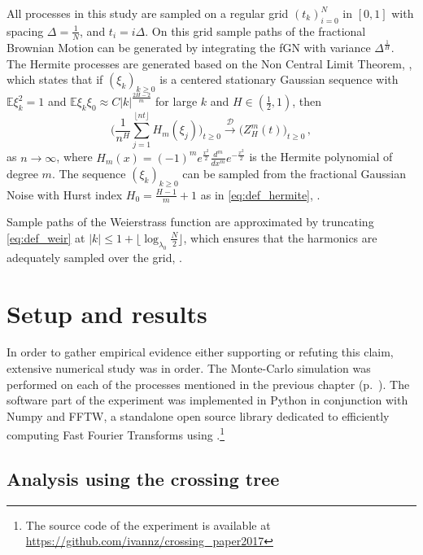 \documentclass[a4paper]{article}
\newcommand{\ex}{\mathbb{E}}
\newcommand{\Dcal}{\mathcal{D}}
\begin{document}
All processes in this study are sampled on a regular grid $(t_k)_{i=0}^N$ in $[0,1]$
with spacing $\Delta=\frac{1}{N}$, and $t_i = i \Delta$. On this grid sample paths
of the fractional Brownian Motion can be generated by integrating the fGN with variance
$\Delta^\frac{1}{H}$. The Hermite processes are generated based on the Non Central
Limit Theorem, \cite{embrechts2002,tudor2008}, which states that if $(\xi_k)_{k\geq0}$
is a centered stationary Gaussian sequence with $\ex\xi_k^2=1$ and
$\ex \xi_k \xi_0 \approx C |k|^\frac{2H-2}{m}$ for large $k$ and $H\in(\frac{1}{2}, 1)$,
then
\begin{equation*}
    \biggl(\frac{1}{n^H} \sum_{j=1}^{\lfloor n t\rfloor}
        H_m(\xi_j)\biggr)_{t\geq0} 
            \overset{\Dcal}{\longrightarrow} \bigl(Z_H^m(t)\bigr)_{t\geq0} \,,
\end{equation*}
as $n\to\infty$, where $H_m(x) = (-1)^m e^\frac{x^2}{2}\frac{d^m}{dx^m}e^{-\frac{x^2}{2}}$
is the Hermite polynomial of degree $m$. The sequence $(\xi_k)_{k\geq0}$ can be sampled
from the fractional Gaussian Noise with Hurst index $H_0 = \frac{H-1}{m}+1$ as in
\eqref{eq:def_hermite}, \cite{embrechts2000introduction}.

Sample paths of the Weierstrass function are approximated by truncating \eqref{eq:def_weir}
at $|k| \leq 1+\bigl\lfloor \log_{\lambda_0} \frac{N}{2} \bigr\rfloor$, which ensures
that the harmonics are adequately sampled over the grid, \cite{decrouez2013}.



\section{Setup and results} %
\label{sec:experiment}

In order to gather empirical evidence either supporting or refuting this claim,
extensive numerical study was in order. The Monte-Carlo simulation was performed
on each of the processes mentioned in the previous chapter (p.~\pageref{sec:self_sim_processes}).
The software part of the experiment was implemented in Python in conjunction with
Numpy and FFTW, a standalone open source library dedicated to efficiently computing
Fast Fourier Transforms using .\footnote{The source code of the experiment is available
at \url{https://github.com/ivannz/crossing_paper2017}}

\subsection{Analysis using the crossing tree} %
\label{sub:analysis_using_the_crossing_tree}
\end{document}
